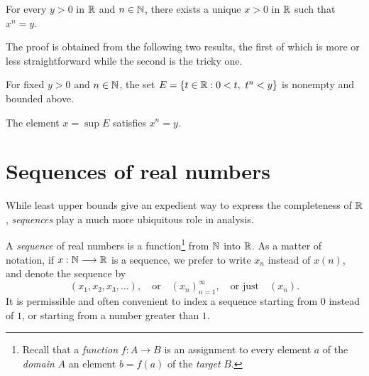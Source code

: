 \documentclass{book}
\begin{document}
\begin{thmdag}
For every $y> 0$ in $\mathbb{R}$ and $n \in \mathbb{N}$, there exists a unique $x > 0$ in $\mathbb{R}$ such that $x^n = y$.
\label{T:nthroots}
\end{thmdag}
\noindent The proof is obtained from the following two results, the first of which is more or less straightforward while
the second is the tricky one.
\begin{lem}
For fixed $y > 0$ and $n \in \mathbb{N}$, the set $E = \left\{ t \in \mathbb{R} : 0 < t,\ t^n < y \right\}$ is nonempty and bounded above.
\label{L:nthroots1}
\end{lem}
\begin{lemdag}
The element $x = \sup E$ satisfies $x^n = y$.
\label{L:nthroots2}
\end{lemdag}

\section{Sequences of real numbers} \label{S:seqs}
While least upper bounds give an expedient way to express the
completeness of $\mathbb{R}$, {\em sequences} play a much more ubiquitous role in
analysis.

\begin{defn}
A {\em sequence} of real numbers is a function\footnote{Recall that a {\em function} $f : A \to B$ is an assignment to every element $a$ of the {\em domain} $A$ an element $b = f(a)$ of the {\em target} $B$.} from $\mathbb{N}$ into $\mathbb{R}$. As a
matter of notation, if $x : \mathbb{N} \longrightarrow \mathbb{R}$ is a sequence, we prefer to write $x_n$ instead of $x(n)$, and
denote the sequence by
\[
	(x_1,x_2,x_3,\ldots), 
	\quad \text{or} \quad  
	(x_n)_{n=1}^\infty, 
	\quad \text{or just} \quad 
	(x_n).
\]
It is permissible and often convenient
to index a sequence starting from $0$ instead of $1$, or
starting from a number greater than $1$. 
\label{D:real_sequence}
\end{defn}
\end{document}
